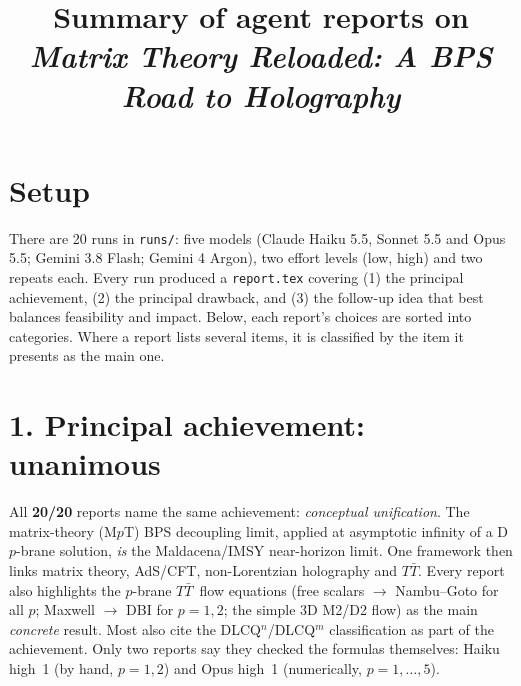 \documentclass[11pt,a4paper]{article}
\title{Summary of agent reports on\\ \emph{Matrix Theory Reloaded: A BPS Road to Holography}}
\author{}
\date{}
\newcommand{\MpT}{M$p$T}
\newcommand{\TTbar}{$T\bar T$}
\begin{document}
\maketitle
\vspace{-3em}

\section*{Setup}
There are 20 runs in \texttt{runs/}: five models (Claude Haiku 5.5, Sonnet 5.5 and Opus 5.5; Gemini 3.8 Flash; Gemini 4 Argon), two effort levels (low, high) and two repeats each. Every run produced a \texttt{report.tex} covering (1) the principal achievement, (2) the principal drawback, and (3) the follow-up idea that best balances feasibility and impact. Below, each report's choices are sorted into categories. Where a report lists several items, it is classified by the item it presents as the main one.

\section*{1. Principal achievement: unanimous}
All \textbf{20/20} reports name the same achievement: \emph{conceptual unification}. The matrix-theory (\MpT) BPS decoupling limit, applied at asymptotic infinity of a D$p$-brane solution, \emph{is} the Maldacena/IMSY near-horizon limit. One framework then links matrix theory, AdS/CFT, non-Lorentzian holography and \TTbar.
Every report also highlights the $p$-brane \TTbar\ flow equations (free scalars $\to$ Nambu--Goto for all $p$; Maxwell $\to$ DBI for $p=1,2$; the simple 3D M2/D2 flow) as the main \emph{concrete} result. Most also cite the DLCQ$^n$/DLCQ$^m$ classification as part of the achievement.
Only two reports say they checked the formulas themselves: Haiku high~1 (by hand, $p=1,2$) and Opus high~1 (numerically, $p=1,\dots,5$).
\end{document}
